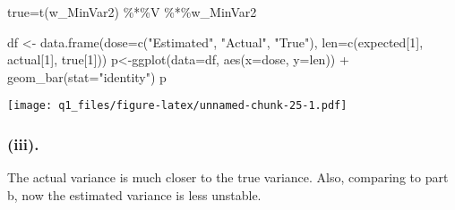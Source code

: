 \documentclass[
]{article}
\newenvironment{Shaded}{\begin{snugshade}}{\end{snugshade}}
\newcommand{\AttributeTok}[1]{\textcolor[rgb]{0.77,0.63,0.00}{#1}}
\newcommand{\CommentTok}[1]{\textcolor[rgb]{0.56,0.35,0.01}{\textit{#1}}}
\newcommand{\DecValTok}[1]{\textcolor[rgb]{0.00,0.00,0.81}{#1}}
\newcommand{\FunctionTok}[1]{\textcolor[rgb]{0.00,0.00,0.00}{#1}}
\newcommand{\NormalTok}[1]{#1}
\newcommand{\OtherTok}[1]{\textcolor[rgb]{0.56,0.35,0.01}{#1}}
\newcommand{\SpecialCharTok}[1]{\textcolor[rgb]{0.00,0.00,0.00}{#1}}
\newcommand{\StringTok}[1]{\textcolor[rgb]{0.31,0.60,0.02}{#1}}
\begin{document}
\begin{Shaded}
\end{Shaded}

\begin{Shaded}
\begin{Highlighting}[]
\NormalTok{true}\OtherTok{=}\FunctionTok{t}\NormalTok{(w\_MinVar2) }\SpecialCharTok{\%*\%}\NormalTok{V }\SpecialCharTok{\%*\%}\NormalTok{w\_MinVar2}
\end{Highlighting}
\end{Shaded}

\begin{Shaded}
\begin{Highlighting}[]
\NormalTok{df }\OtherTok{\textless{}{-}} \FunctionTok{data.frame}\NormalTok{(}\AttributeTok{dose=}\FunctionTok{c}\NormalTok{(}\StringTok{"Estimated"}\NormalTok{, }\StringTok{"Actual"}\NormalTok{, }\StringTok{"True"}\NormalTok{),}
                \AttributeTok{len=}\FunctionTok{c}\NormalTok{(expected[}\DecValTok{1}\NormalTok{], actual[}\DecValTok{1}\NormalTok{], true[}\DecValTok{1}\NormalTok{]))}
\NormalTok{p}\OtherTok{\textless{}{-}}\FunctionTok{ggplot}\NormalTok{(}\AttributeTok{data=}\NormalTok{df, }\FunctionTok{aes}\NormalTok{(}\AttributeTok{x=}\NormalTok{dose, }\AttributeTok{y=}\NormalTok{len)) }\SpecialCharTok{+}
  \FunctionTok{geom\_bar}\NormalTok{(}\AttributeTok{stat=}\StringTok{"identity"}\NormalTok{)}
\NormalTok{p}
\end{Highlighting}
\end{Shaded}

\texttt{[image: q1\_files/figure-latex/unnamed-chunk-25-1.pdf]}

\hypertarget{iii.-1}{%
\subsubsection{(iii).}\label{iii.-1}}

The actual variance is much closer to the true variance. Also, comparing
to part b, now the estimated variance is less unstable.
\end{document}

